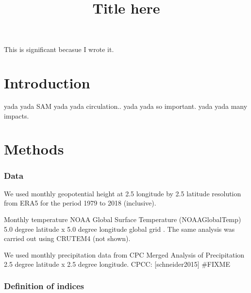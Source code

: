 \documentclass[twocol]{ametsocV5}
\title{Title here}
\affiliation{CIMA UBA blablabla}
\begin{document}
\maketitle


%
%
\statement
This is significant becasue I wrote it.



%

\section{Introduction}

yada yada SAM yada yada circulation.. yada yada so important. yada yada
many impacts.

\section{Methods}

\subsubsection{Data}

We used monthly geopotential height at 2.5 longitude by 2.5 latitude
resolution from ERA5 \citep{hersbach} for the period 1979 to 2018
(inclusive).

Monthly temperature NOAA Global Surface Temperature (NOAAGlobalTemp) 5.0
degree latitude x 5.0 degree longitude global grid
\citep{vose2012, smith2008}. The same analysis was carried out using
CRUTEM4 \citep{osborn2014} (not shown).

We used monthly precipitation data from CPC Merged Analysis of
Precipitation \citep{xie1997} 2.5 degree latitude x 2.5 degree
longitude. CPCC: {[}schneider2015{]} \#FIXME

\subsubsection{Definition of indices}
\end{document}
